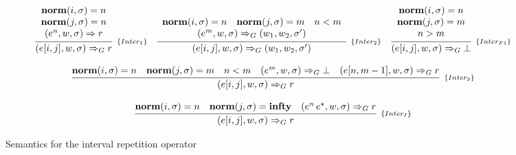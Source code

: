 \documentclass[sigplan,screen]{acmart}
\theoremstyle{definition}
\begin{document}
\begin{figure}[h!]
  \[
    \begin{array}{ccc}
      \infer[_{\{Inter_{1}\}}]
            {(e[i,j],w,\sigma) \Rightarrow_G r}
            {\begin{array}{c}
               \mathbf{norm}(i,\sigma) = n \\
               \mathbf{norm}(j,\sigma) = n \\
               (e^n,w, \sigma)\Rightarrow r
            \end{array}} &
      \infer[_{\{Inter_2\}}]
            {(e[i,j],w,\sigma)\Rightarrow_G (w_1,w_2,\sigma')}
            {\begin{array}{c}
              \mathbf{norm}(i,\sigma) = n \quad
              \mathbf{norm}(j,\sigma) = m \quad
              n < m \\
              (e^{m}, w, \sigma)\Rightarrow_G (w_1,w_2,\sigma')
          \end{array}} &
      \infer[_{\{Inter_{F1}\}}]
            {(e[i,j], w, \sigma) \Rightarrow_G \bot}
            {\begin{array}{c}
                \mathbf{norm}(i,\sigma) = n\\
                \mathbf{norm}(j,\sigma) = m\\
                n > m\\
            \end{array}} \\ & \\
       \multicolumn{3}{c}{
        \infer[_{\{Inter_3\}}]
              {(e[i,j], w, \sigma) \Rightarrow_G r}
              {\mathbf{norm}(i,\sigma) = n &
               \mathbf{norm}(j,\sigma) = m &
               n < m &
               (e^{m},w,\sigma)\Rightarrow_G \bot  &
               (e[n,m - 1],w, \sigma)\Rightarrow_G r}
        } \\ & \\
       \multicolumn{3}{c}{
          \infer[_{\{Inter_{I}\}}]
                {(e[i,j], w, \sigma) \Rightarrow_G r}
                {
                    \mathbf{norm}(i,\sigma) = n &
                    \mathbf{norm}(j,\sigma) = \mathbf{infty} &
                    (e^n\,e^{\star},w,\sigma)\Rightarrow_G r
                }
        }
    \end{array}
  \]
  \centering
  \caption{Semantics for the interval repetition operator}
  \label{fig:intervalsemantics}
\end{figure}
\end{document}
